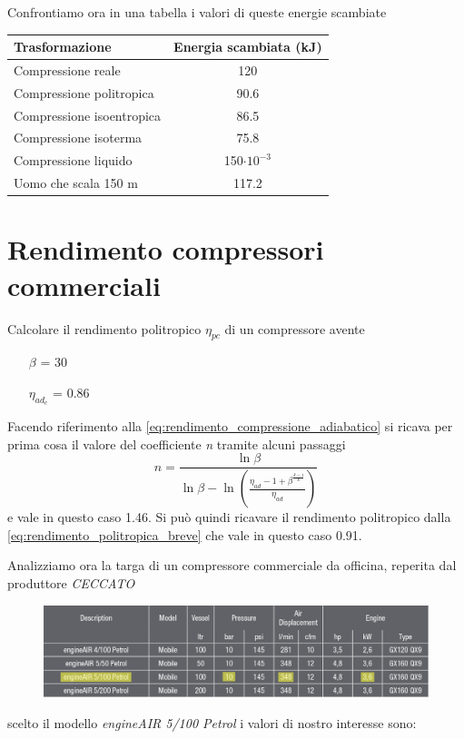 \documentclass[a4paper,12pt]{article}
\begin{document}
Confrontiamo ora in una tabella i valori di queste energie scambiate
\begin{center}
    \begin{tabular}{l|c}
        Trasformazione & Energia scambiata (kJ)\\ \hline
        Compressione reale        & 120  \\
        Compressione politropica  & 90.6 \\
        Compressione isoentropica & 86.5 \\
        Compressione isoterma     & 75.8 \\
        Compressione liquido      & 150$\cdot 10^{-3}$  \\
        Uomo che scala 150 m      & 117.2
    \end{tabular}
\end{center}

\section{Rendimento compressori commerciali}
Calcolare il rendimento politropico $\eta_{pc}$ di un compressore avente
\begin{itemize}
    \item[$\beta$] = 30
    \item[$\eta_{ad_c}$] = 0.86
\end{itemize}
Facendo riferimento alla \eqref{eq:rendimento_compressione_adiabatico} si ricava per prima cosa il valore
del coefficiente \textit{n} tramite alcuni passaggi
\begin{equation}
    n = \frac{\ln\beta}{\ln\beta - \ln\left(\frac{\eta_{ad}-1+\beta^{\frac{k-1}{k}}}{\eta_{ad}}\right)}
\end{equation}
e vale in questo caso 1.46.
Si può quindi ricavare il rendimento politropico dalla \eqref{eq:rendimento_politropica_breve} che vale in questo caso 0.91.

Analizziamo ora la targa di un compressore commerciale da officina, reperita dal produttore \textit{CECCATO}
\begin{figure}[H]
    \centering
    \includegraphics[width=0.99\linewidth]{media/catalogo.png}
\end{figure}
scelto il modello \textit{engineAIR 5/100 Petrol} i valori di nostro interesse sono:
\end{document}
